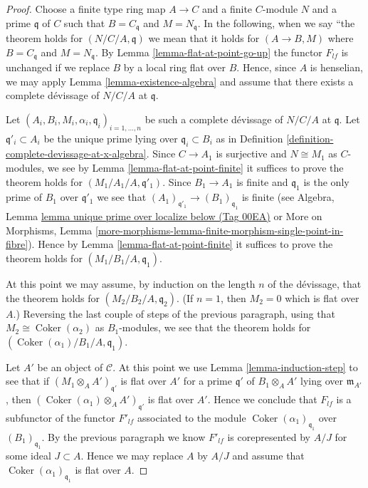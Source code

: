 \documentclass{amsart}
\theoremstyle{plain}
\theoremstyle{definition}
\theoremstyle{remark}
\numberwithin{equation}{subsection}
\def\Coker{\mathop{\mathrm{Coker}}}
\begin{document}
\begin{proof}
Choose a finite type ring map $A \to C$ and a finite $C$-module $N$
and a prime $\mathfrak q$ of $C$ such that $B = C_{\mathfrak q}$
and $M = N_{\mathfrak q}$. In the following, when we say
``the theorem holds for $(N/C/A, \mathfrak q)$ we mean that
it holds for $(A \to B, M)$ where $B = C_{\mathfrak q}$ and
$M = N_{\mathfrak q}$. By
Lemma \ref{lemma-flat-at-point-go-up}
the functor $F_{lf}$ is unchanged if we replace $B$ by a local ring
flat over $B$. Hence, since $A$ is henselian, we may apply
Lemma \ref{lemma-existence-algebra}
and assume that there exists a complete d\'evissage of
$N/C/A$ at $\mathfrak q$.

\medskip\noindent
Let $(A_i, B_i, M_i, \alpha_i, \mathfrak q_i)_{i = 1, \ldots, n}$
be such a complete d\'evissage of $N/C/A$ at $\mathfrak q$. Let
$\mathfrak q'_i \subset A_i$ be the unique prime lying over
$\mathfrak q_i \subset B_i$ as in
Definition \ref{definition-complete-devissage-at-x-algebra}.
Since $C \to A_1$ is surjective and $N \cong M_1$ as $C$-modules,
we see by
Lemma \ref{lemma-flat-at-point-finite}
it suffices to prove the theorem holds for $(M_1/A_1/A, \mathfrak q'_1)$.
Since $B_1 \to A_1$ is finite and $\mathfrak q_1$ is the only prime
of $B_1$ over $\mathfrak q'_1$ we see that
$(A_1)_{\mathfrak q'_1} \to (B_1)_{\mathfrak q_1}$ is finite (see
Algebra, Lemma \href{https://stacks.math.columbia.edu/tag/00EA}{lemma unique prime over localize below (Tag 00EA)} or
More on Morphisms,
Lemma \ref{more-morphisms-lemma-finite-morphism-single-point-in-fibre}).
Hence by
Lemma \ref{lemma-flat-at-point-finite}
it suffices to prove the theorem holds for $(M_1/B_1/A, \mathfrak q_1)$.

\medskip\noindent
At this point we may assume, by induction on the length $n$ of the
d\'evissage, that the theorem holds for $(M_2/B_2/A, \mathfrak q_2)$.
(If $n = 1$, then $M_2 = 0$ which is flat over $A$.)
Reversing the last couple of steps of the previous paragraph, using
that $M_2 \cong \Coker(\alpha_2)$ as $B_1$-modules, we see
that the theorem holds for $(\Coker(\alpha_1)/B_1/A, \mathfrak q_1)$.

\medskip\noindent
Let $A'$ be an object of $\mathcal{C}$. At this point we use
Lemma \ref{lemma-induction-step}
to see that if $(M_1 \otimes_A A')_{\mathfrak q'}$ is flat
over $A'$ for a prime $\mathfrak q'$ of $B_1 \otimes_A A'$
lying over $\mathfrak m_{A'}$, then
$(\Coker(\alpha_1) \otimes_A A')_{\mathfrak q'}$ is flat over $A'$.
Hence we conclude that $F_{lf}$ is a subfunctor of the
functor $F'_{lf}$ associated to the module
$\Coker(\alpha_1)_{\mathfrak q_1}$ over $(B_1)_{\mathfrak q_1}$.
By the previous paragraph we know $F'_{lf}$ is corepresented by
$A/J$ for some ideal $J \subset A$. Hence we may replace $A$ by
$A/J$ and assume that $\Coker(\alpha_1)_{\mathfrak q_1}$ is
flat over $A$.


\end{proof}
\end{document}
